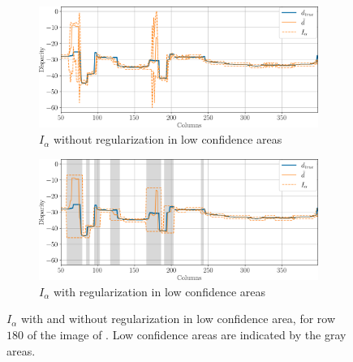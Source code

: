 \begin{figure}
    \centering
    \begin{subfigure}[t]{\linewidth}
        \centering
        \includegraphics[width=\linewidth]{Images/Chap_5/intervals_ambiguous_area_row_180_1.png}
        \caption{$I_\alpha$ without regularization in low confidence areas}
        \label{fig:intervals_ambiguous_row_180_1}
    \end{subfigure}\hfill
    \begin{subfigure}[t]{\linewidth}
        \centering
        \includegraphics[width=\linewidth]{Images/Chap_5/intervals_ambiguous_area_row_180_2.png}
        \caption{$I_\alpha$ with regularization in low confidence areas}
        \label{fig:intervals_ambiguous_row_180_2}
    \end{subfigure}
    \caption{$I_\alpha$ with and without regularization in low confidence area, for row $180$ of the image of . Low confidence areas are indicated by the gray areas.}
    \label{fig:intervals_ambiguous_row_180}
\end{figure}

